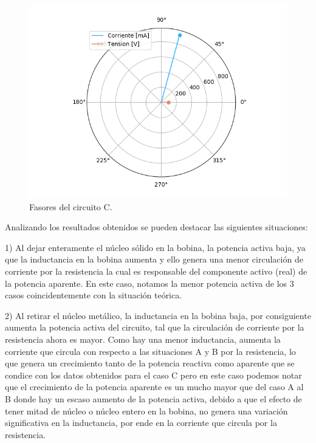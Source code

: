 \documentclass[a4paper]{article}
\begin{document}
\begin{figure}[H]
\centering
\begin{minipage}{.5\textwidth}
	\centering
	\includegraphics[width=1.2\linewidth]{Fasorial-1C.png}
	\caption{Fasores del circuito C.}
	\label{fig:faso-1c}
\end{minipage}
\end{figure}

Analizando los resultados obtenidos se pueden destacar las siguientes situaciones:

1) Al dejar enteramente el núcleo sólido en la bobina, la potencia activa baja, ya que la inductancia en la bobina aumenta y ello genera una menor circulación de corriente por la resistencia la cual es responsable del componente activo (real) de la potencia aparente. En este caso, notamos la menor potencia activa de los 3 casos coincidentemente con la situación teórica.

2) Al retirar el núcleo metálico, la inductancia en la bobina baja, por consiguiente aumenta la potencia activa del circuito, tal que la circulación de corriente por la resistencia ahora es mayor. Como hay una menor inductancia, aumenta la corriente que circula con respecto a las situaciones A y B por la resistencia, lo que genera un crecimiento tanto de la potencia reactiva como aparente que se condice con los datos obtenidos para el caso C pero en este caso podemos notar que el crecimiento de la potencia aparente es un mucho mayor que del caso A al B donde hay un escaso aumento de la potencia activa, debido a que el efecto de tener mitad de núcleo o núcleo entero en la bobina, no genera una variación significativa en la inductancia, por ende en la corriente que circula por la resistencia.
\end{document}
